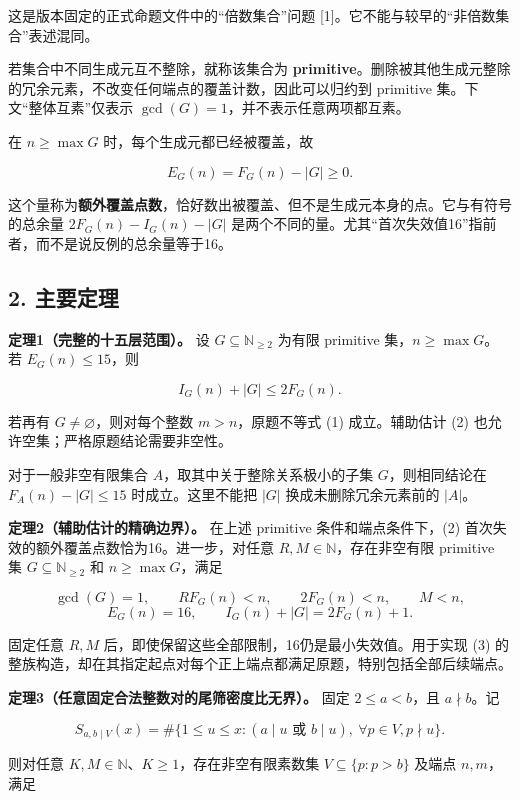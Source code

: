 \documentclass[
  11pt,
]{article}
\begin{document}
这是版本固定的正式命题文件中的``倍数集合''问题
{[}1{]}。它不能与较早的``非倍数集合''表述混同。

若集合中不同生成元互不整除，就称该集合为
\textbf{primitive}。删除被其他生成元整除的冗余元素，不改变任何端点的覆盖计数，因此可以归约到
primitive 集。下文``整体互素''仅表示
\(\gcd(G)=1\)，并不表示任意两项都互素。

在 \(n\ge\max G\) 时，每个生成元都已经被覆盖，故

\[
E_G(n)=F_G(n)-|G|\ge0.
\]

这个量称为\textbf{额外覆盖点数}，恰好数出被覆盖、但不是生成元本身的点。它与有符号的总余量
\(2F_G(n)-I_G(n)-|G|\)
是两个不同的量。尤其``首次失效值16''指前者，而不是说反例的总余量等于16。

\hypertarget{ux4e3bux8981ux5b9aux7406}{%
\subsection{2. 主要定理}\label{ux4e3bux8981ux5b9aux7406}}

\textbf{定理1（完整的十五层范围）。} 设 \(G\subseteq\mathbb N_{\ge2}\)
为有限 primitive 集，\(n\ge\max G\)。若 \(E_G(n)\le15\)，则

\[
I_G(n)+|G|\le2F_G(n). \tag{2}
\]

若再有 \(G\ne\varnothing\)，则对每个整数 \(m>n\)，原题不等式 (1)
成立。辅助估计 (2) 也允许空集；严格原题结论需要非空性。

对于一般非空有限集合 \(A\)，取其中关于整除关系极小的子集
\(G\)，则相同结论在 \(F_A(n)-|G|\le15\) 时成立。这里不能把 \(|G|\)
换成未删除冗余元素前的 \(|A|\)。

\textbf{定理2（辅助估计的精确边界）。} 在上述 primitive
条件和端点条件下，(2) 首次失效的额外覆盖点数恰为16。进一步，对任意
\(R,M\in\mathbb N\)，存在非空有限 primitive 集
\(G\subseteq\mathbb N_{\ge2}\) 和 \(n\ge\max G\)，满足

\[
\gcd(G)=1,\qquad RF_G(n)<n,\qquad 2F_G(n)<n,\qquad M<n,
\] \[
E_G(n)=16,\qquad I_G(n)+|G|=2F_G(n)+1. \tag{3}
\]

固定任意 \(R,M\) 后，即使保留这些全部限制，16仍是最小失效值。用于实现
(3)
的整族构造，却在其指定起点对每个正上端点都满足原题，特别包括全部后续端点。

\textbf{定理3（任意固定合法整数对的尾筛密度比无界）。} 固定
\(2\le a<b\)，且 \(a\nmid b\)。记

\[
S_{a,b\mid V}(x)=\#\{1\le u\le x:(a\mid u\text{ 或 }b\mid u),
\ \forall p\in V, p\nmid u\}.
\]

则对任意 \(K,M\in\mathbb N\)、\(K\ge1\)，存在非空有限素数集
\(V\subseteq\{p:p>b\}\) 及端点 \(n,m\)，满足
\end{document}
